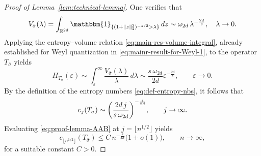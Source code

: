 \documentclass[a4paper,12pt]{article}
\let\originalleft\left
\let\originalright\right
\renewcommand{\left}{\mathopen{}\mathclose\bgroup\originalleft}
\renewcommand{\right}{\aftergroup\egroup\originalright}
\newcommand{\R}{\mathbb{R}}
\begin{document}
\begin{proof}[Proof of Lemma~\ref{lem:technical-lemma}]
One verifies that 
\begin{equation}\label{eq:proof-lemma-AAA}
    V_{\bar\sigma}(\lambda)
    =  \int_{\R^{2d}} \mathbbm{1}_{\{(1+\|z\|_2^2)^{-s/2}>\lambda\}}  \,dz
    \sim \omega_{2d}\,\lambda^{-\frac{2d}{s}}, 
    \quad  \lambda \to 0.
\end{equation}
Applying the entropy--volume relation \eqref{eq:main-res-volume-integral},
already established for Weyl quantization in \eqref{eq:mainr-result-for-Weyl-1}, to the operator
$T_{\bar\sigma}$ yields
\[
H_{T_{\bar\sigma}}(\varepsilon)
\sim
\int_\varepsilon^\infty \frac{V_{\bar\sigma}(\lambda)}{\lambda}\,d\lambda
\sim \frac{s \, \omega_{2d}}{2d}\varepsilon^{-\frac{2d}{s}},
\qquad \varepsilon\to0.
\]
By the definition of the entropy numbers \eqref{eq:def-entropy-nbs}, it follows that
\begin{equation}\label{eq:proof-lemma-AAB}
    e_j(T_{\bar\sigma})
    \sim
    \left(\frac{2d\,j}{s\,\omega_{2d}}\right)^{-\frac{s}{2d}},
    \qquad j\to\infty.
\end{equation}
Evaluating \eqref{eq:proof-lemma-AAB} at \(j=\lfloor n^{1/2}\rfloor\) yields
\begin{equation}\label{eq:poly-scaling-ent-nb}
    e_{\lfloor n^{1/2}\rfloor}(T_{\bar\sigma})
    \le
    C\,n^{-\frac{s}{4d}}\bigl(1+o(1)\bigr),
    \qquad n\to\infty,
\end{equation}
for a suitable constant \(C>0\).

\end{proof}
\end{document}
